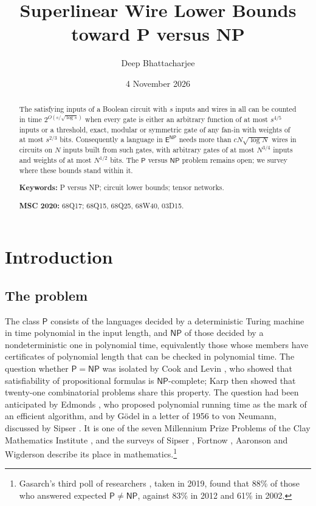 \documentclass[11pt,reqno]{amsart}
\title[Superlinear wire lower bounds]{Superlinear Wire Lower Bounds toward P versus NP}
\author{Deep Bhattacharjee}
\date{4 November 2026}
\numberwithin{equation}{section}
\theoremstyle{plain}
\theoremstyle{definition}
\theoremstyle{remark}
\newcommand{\Pc}{\mathsf{P}}
\newcommand{\NP}{\mathsf{NP}}
\newcommand{\ENP}{\mathsf{E}^{\mathsf{NP}}}
\begin{document}
\begin{abstract}
The satisfying inputs of a Boolean circuit with $s$ inputs and wires in all
can be counted in time $2^{O(s/\sqrt{\log s})}$ when every gate is either an
arbitrary function of at most $s^{4/5}$ inputs or a threshold, exact, modular or
symmetric gate of any fan-in with weights of at most $s^{2/3}$ bits.
Consequently a language in $\ENP$ needs more than $cN\sqrt{\log N}$ wires in
circuits on $N$ inputs built from such gates, with arbitrary gates of at most
$N^{3/4}$ inputs and weights of at most $N^{1/2}$ bits. The
$\Pc$ versus $\NP$ problem remains open; we survey where these bounds stand
within it.

\medskip
\noindent\textbf{Keywords:} P versus NP; circuit lower bounds; tensor networks.

\noindent\textbf{MSC 2020:} 68Q17; 68Q15, 68Q25, 68W40, 03D15.
\end{abstract}

\maketitle
\setcounter{tocdepth}{1}
\tableofcontents

\section{Introduction}\label{sec:intro}

\subsection{The problem}
The class $\Pc$ consists of the languages decided by a deterministic Turing
machine in time polynomial in the input length, and $\NP$ of those decided by a
nondeterministic one in polynomial time, equivalently those whose members have
certificates of polynomial length that can be checked in polynomial time. The
question whether $\Pc=\NP$ was isolated by Cook \cite{Coo71} and Levin
\cite{Lev73}, who showed that satisfiability of propositional formulas is
$\NP$-complete; Karp \cite{Kar72} then showed that twenty-one combinatorial
problems share this property. The question had been anticipated by Edmonds
\cite{Edm65}, who proposed polynomial running time as the mark of an efficient
algorithm, and by G\"odel in a letter of 1956 to von Neumann, discussed by Sipser
\cite{Sip92}. It is one of the seven Millennium Prize Problems of the Clay
Mathematics Institute \cite{Clay}, and the surveys of Sipser \cite{Sip92},
Fortnow \cite{For09}, Aaronson \cite{Aar16} and Wigderson \cite{Wig19} describe
its place in mathematics.\footnote{Gasarch's third poll of researchers
\cite{Gas19}, taken in 2019, found that 88\% of those who answered expected
$\Pc\ne\NP$, against 83\% in 2012 and 61\% in 2002.}
\end{document}
